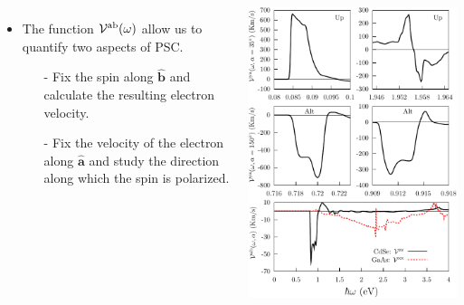 \documentclass{beamer}
\begin{document}
\begin{frame}

{\small


\begin{columns}



\begin{itemize}

\item 
The function ${\cal V}^{\mathrm{a}\mathrm{b}}(\omega)$ allow us to quantify
two aspects of PSC. 


\begin{itemize}

\item[-]
Fix the spin along $\hat{\mathbf{b}}$ and calculate the resulting electron
velocity.

\item[-] 
Fix the velocity of the electron along $\hat{\mathbf{a}}$ and study the
direction along which the spin is polarized.
\end{itemize}

\end{itemize}


\includegraphics[width=1.0\textwidth]{figs/vcomp.pdf}

\end{columns}


}
\end{frame}
\end{document}
